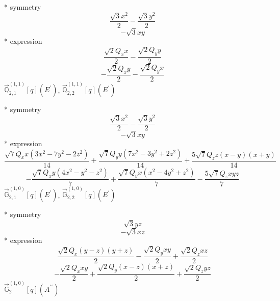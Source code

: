 \documentclass[fleqn,8pt]{jsarticle}
\begin{document}
\noindent\quad ** symmetry
\begin{dmath*}
\frac{\sqrt{3} x^{2}}{2} - \frac{\sqrt{3} y^{2}}{2}
\end{dmath*}
\begin{dmath*}
- \sqrt{3} x y
\end{dmath*}
\noindent\quad ** expression
\begin{dmath*}
\frac{\sqrt{2} Q_{x} x}{2} - \frac{\sqrt{2} Q_{y} y}{2}
\end{dmath*}
\begin{dmath*}
- \frac{\sqrt{2} Q_{x} y}{2} - \frac{\sqrt{2} Q_{y} x}{2}
\end{dmath*}
\noindent\quad $\vec{\mathbb{Q}}_{2,1}^{(1,1)}[q](E^{\prime})$, $\vec{\mathbb{Q}}_{2,2}^{(1,1)}[q](E^{\prime})$

\noindent\quad ** symmetry
\begin{dmath*}
\frac{\sqrt{3} x^{2}}{2} - \frac{\sqrt{3} y^{2}}{2}
\end{dmath*}
\begin{dmath*}
- \sqrt{3} x y
\end{dmath*}
\noindent\quad ** expression
\begin{dmath*}
\frac{\sqrt{7} Q_{x} x \left(3 x^{2} - 7 y^{2} - 2 z^{2}\right)}{14} + \frac{\sqrt{7} Q_{y} y \left(7 x^{2} - 3 y^{2} + 2 z^{2}\right)}{14} + \frac{5 \sqrt{7} Q_{z} z \left(x - y\right) \left(x + y\right)}{14}
\end{dmath*}
\begin{dmath*}
- \frac{\sqrt{7} Q_{x} y \left(4 x^{2} - y^{2} - z^{2}\right)}{7} + \frac{\sqrt{7} Q_{y} x \left(x^{2} - 4 y^{2} + z^{2}\right)}{7} - \frac{5 \sqrt{7} Q_{z} x y z}{7}
\end{dmath*}
\noindent\quad $\vec{\mathbb{G}}_{2,1}^{(1,0)}[q](E^{\prime})$, $\vec{\mathbb{G}}_{2,2}^{(1,0)}[q](E^{\prime})$

\noindent\quad ** symmetry
\begin{dmath*}
\sqrt{3} y z
\end{dmath*}
\begin{dmath*}
- \sqrt{3} x z
\end{dmath*}
\noindent\quad ** expression
\begin{dmath*}
\frac{\sqrt{2} Q_{x} \left(y - z\right) \left(y + z\right)}{2} - \frac{\sqrt{2} Q_{y} x y}{2} + \frac{\sqrt{2} Q_{z} x z}{2}
\end{dmath*}
\begin{dmath*}
- \frac{\sqrt{2} Q_{x} x y}{2} + \frac{\sqrt{2} Q_{y} \left(x - z\right) \left(x + z\right)}{2} + \frac{\sqrt{2} Q_{z} y z}{2}
\end{dmath*}
\noindent\quad $\vec{\mathbb{G}}_{2}^{(1,0)}[q](A^{\prime\prime})$
\end{document}
